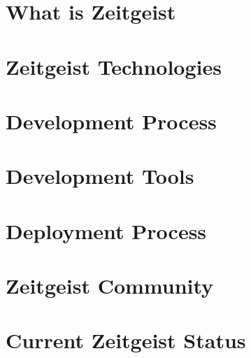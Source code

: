 \documentclass[10pt]{book}
\begin{document}


\tableofcontents

\chapter{What is Zeitgeist}
\chapter{Zeitgeist Technologies}
\chapter{Development Process}
\chapter{Development Tools}
\chapter{Deployment Process}
\chapter{Zeitgeist Community}
\chapter{Current Zeitgeist Status}
\end{document}
